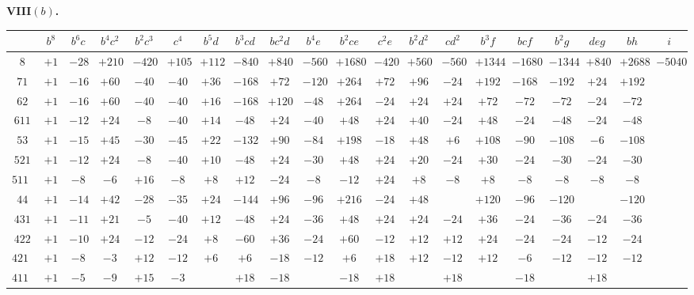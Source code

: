 \documentclass[11pt,a4paper]{book}
\begin{document}
\noindent\textbf{VIII$(b)$.}
\begin{center}
\tiny
\begin{tabular}{c|c|c|c|c|c|c|c|c|c|c|c|c|c|c|c|c|c|c|c}
& $b^8$ & $b^6c$ & $b^4c^2$ & $b^2c^3$ & $c^4$ & $b^5d$ & $b^3cd$ & $bc^2d$ & $b^4e$ & $b^2ce$ & $c^2e$ & $b^2d^2$ & $cd^2$ & $b^3f$ & $bcf$ & $b^2g$ & $deg$ & $bh$ & $i$ \\
\hline
$8$ & $+1$ & $-28$ & $+210$ & $-420$ & $+105$ & $+112$ & $-840$ & $+840$ & $-560$ & $+1680$ & $-420$ & $+560$ & $-560$ & $+1344$ & $-1680$ & $-1344$ & $+840$ & $+2688$ & $-5040$ \\
$71$ & $+1$ & $-16$ & $+60$ & $-40$ & $-40$ & $+36$ & $-168$ & $+72$ & $-120$ & $+264$ & $+72$ & $+96$ & $-24$ & $+192$ & $-168$ & $-192$ & $+24$ & $+192$ & \\
$62$ & $+1$ & $-16$ & $+60$ & $-40$ & $-40$ & $+16$ & $-168$ & $+120$ & $-48$ & $+264$ & $-24$ & $+24$ & $+24$ & $+72$ & $-72$ & $-72$ & $-24$ & $-72$ & \\
$611$ & $+1$ & $-12$ & $+24$ & $-8$ & $-40$ & $+14$ & $-48$ & $+24$ & $-40$ & $+48$ & $+24$ & $+40$ & $-24$ & $+48$ & $-24$ & $-48$ & $-24$ & $-48$ & \\
$53$ & $+1$ & $-15$ & $+45$ & $-30$ & $-45$ & $+22$ & $-132$ & $+90$ & $-84$ & $+198$ & $-18$ & $+48$ & $+6$ & $+108$ & $-90$ & $-108$ & $-6$ & $-108$ & \\
$521$ & $+1$ & $-12$ & $+24$ & $-8$ & $-40$ & $+10$ & $-48$ & $+24$ & $-30$ & $+48$ & $+24$ & $+20$ & $-24$ & $+30$ & $-24$ & $-30$ & $-24$ & $-30$ & \\
$5111$ & $+1$ & $-8$ & $-6$ & $+16$ & $-8$ & $+8$ & $+12$ & $-24$ & $-8$ & $-12$ & $+24$ & $+8$ & $-8$ & $+8$ & $-8$ & $-8$ & $-8$ & $-8$ & \\
$44$ & $+1$ & $-14$ & $+42$ & $-28$ & $-35$ & $+24$ & $-144$ & $+96$ & $-96$ & $+216$ & $-24$ & $+48$ & & $+120$ & $-96$ & $-120$ & & $-120$ & \\
$431$ & $+1$ & $-11$ & $+21$ & $-5$ & $-40$ & $+12$ & $-48$ & $+24$ & $-36$ & $+48$ & $+24$ & $+24$ & $-24$ & $+36$ & $-24$ & $-36$ & $-24$ & $-36$ & \\
$422$ & $+1$ & $-10$ & $+24$ & $-12$ & $-24$ & $+8$ & $-60$ & $+36$ & $-24$ & $+60$ & $-12$ & $+12$ & $+12$ & $+24$ & $-24$ & $-24$ & $-12$ & $-24$ & \\
$4211$ & $+1$ & $-8$ & $-3$ & $+12$ & $-12$ & $+6$ & $+6$ & $-18$ & $-12$ & $+6$ & $+18$ & $+12$ & $-12$ & $+12$ & $-6$ & $-12$ & $-12$ & $-12$ & \\
$41111$ & $+1$ & $-5$ & $-9$ & $+15$ & $-3$ & & $+18$ & $-18$ & & $-18$ & $+18$ & & $+18$ & & $-18$ & & $+18$ & & \\

\end{tabular}
\end{center}
\end{document}
